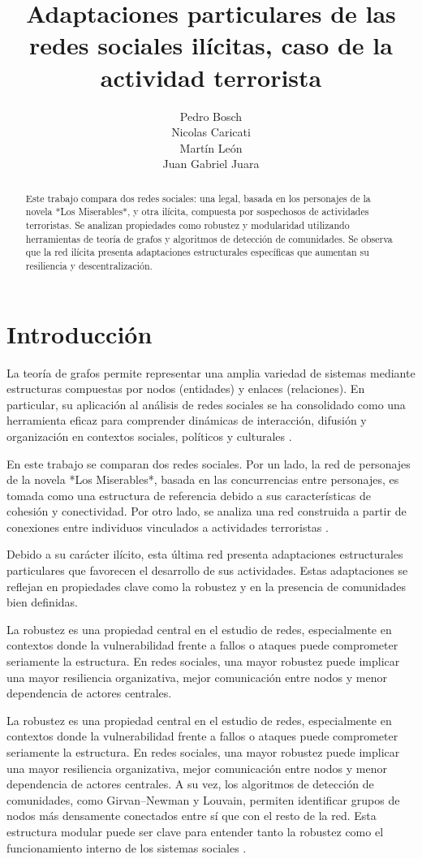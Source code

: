 \documentclass{article}
\title{Adaptaciones particulares de las redes sociales ilícitas, caso de la actividad terrorista}
\author{%
  Pedro Bosch \\
  Nicolas Caricati \\
  Martín León \\
Juan Gabriel Juara
}
\begin{document}
\maketitle

\begin{abstract}
Este trabajo compara dos redes sociales: una legal, basada en los personajes de la novela *Los Miserables*, y otra ilícita, compuesta por sospechosos de actividades terroristas. Se analizan propiedades como robustez y modularidad utilizando herramientas de teoría de grafos y algoritmos de detección de comunidades. Se observa que la red ilícita presenta adaptaciones estructurales específicas que aumentan su resiliencia y descentralización.
\end{abstract}

\section{Introducción}

La teoría de grafos permite representar una amplia variedad de sistemas mediante estructuras compuestas por nodos (entidades) y enlaces (relaciones). En particular, su aplicación al análisis de redes sociales se ha consolidado como una herramienta eficaz para comprender dinámicas de interacción, difusión y organización en contextos sociales, políticos y culturales \cite{albert2000error}.

En este trabajo se comparan dos redes sociales. Por un lado, la red de personajes de la novela *Los Miserables*, basada en las concurrencias entre personajes, es tomada como una estructura de referencia debido a sus características de cohesión y conectividad. Por otro lado, se analiza una red construida a partir de conexiones entre individuos vinculados a actividades terroristas \cite{krebs2002mapping}.

Debido a su carácter ilícito, esta última red presenta adaptaciones estructurales particulares que favorecen el desarrollo de sus actividades. Estas adaptaciones se reflejan en propiedades clave como la robustez y en la presencia de comunidades bien definidas.

La robustez es una propiedad central en el estudio de redes, especialmente en contextos donde la vulnerabilidad frente a fallos o ataques puede comprometer seriamente la estructura. En redes sociales, una mayor robustez puede implicar una mayor resiliencia organizativa, mejor comunicación entre nodos y menor dependencia de actores centrales.

La robustez es una propiedad central en el estudio de redes, especialmente en contextos donde la vulnerabilidad frente a fallos o ataques puede comprometer seriamente la estructura. En redes sociales, una mayor robustez puede implicar una mayor resiliencia organizativa, mejor comunicación entre nodos y menor dependencia de actores centrales. A su vez, los algoritmos de detección de comunidades, como Girvan–Newman y Louvain, permiten identificar grupos de nodos más densamente conectados entre sí que con el resto de la red. Esta estructura modular puede ser clave para entender tanto la robustez como el funcionamiento interno de los sistemas sociales \cite{girvan2002community}.
\end{document}
